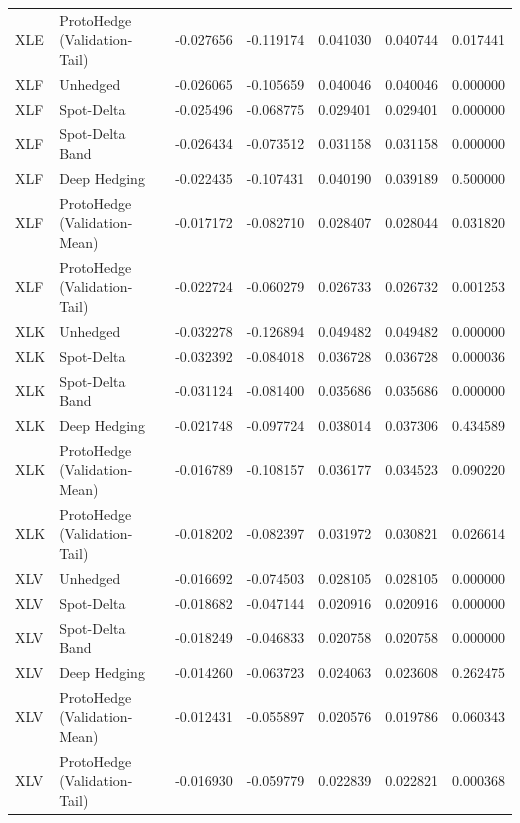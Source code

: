 \begin{tabular}{llrrrrr}
XLE & ProtoHedge (Validation-Tail) & -0.027656 & -0.119174 & 0.041030 & 0.040744 & 0.017441 \\
XLF & Unhedged & -0.026065 & -0.105659 & 0.040046 & 0.040046 & 0.000000 \\
XLF & Spot-Delta & -0.025496 & -0.068775 & 0.029401 & 0.029401 & 0.000000 \\
XLF & Spot-Delta Band & -0.026434 & -0.073512 & 0.031158 & 0.031158 & 0.000000 \\
XLF & Deep Hedging & -0.022435 & -0.107431 & 0.040190 & 0.039189 & 0.500000 \\
XLF & ProtoHedge (Validation-Mean) & -0.017172 & -0.082710 & 0.028407 & 0.028044 & 0.031820 \\
XLF & ProtoHedge (Validation-Tail) & -0.022724 & -0.060279 & 0.026733 & 0.026732 & 0.001253 \\
XLK & Unhedged & -0.032278 & -0.126894 & 0.049482 & 0.049482 & 0.000000 \\
XLK & Spot-Delta & -0.032392 & -0.084018 & 0.036728 & 0.036728 & 0.000036 \\
XLK & Spot-Delta Band & -0.031124 & -0.081400 & 0.035686 & 0.035686 & 0.000000 \\
XLK & Deep Hedging & -0.021748 & -0.097724 & 0.038014 & 0.037306 & 0.434589 \\
XLK & ProtoHedge (Validation-Mean) & -0.016789 & -0.108157 & 0.036177 & 0.034523 & 0.090220 \\
XLK & ProtoHedge (Validation-Tail) & -0.018202 & -0.082397 & 0.031972 & 0.030821 & 0.026614 \\
XLV & Unhedged & -0.016692 & -0.074503 & 0.028105 & 0.028105 & 0.000000 \\
XLV & Spot-Delta & -0.018682 & -0.047144 & 0.020916 & 0.020916 & 0.000000 \\
XLV & Spot-Delta Band & -0.018249 & -0.046833 & 0.020758 & 0.020758 & 0.000000 \\
XLV & Deep Hedging & -0.014260 & -0.063723 & 0.024063 & 0.023608 & 0.262475 \\
XLV & ProtoHedge (Validation-Mean) & -0.012431 & -0.055897 & 0.020576 & 0.019786 & 0.060343 \\
XLV & ProtoHedge (Validation-Tail) & -0.016930 & -0.059779 & 0.022839 & 0.022821 & 0.000368 \\
\bottomrule
\end{tabular}

